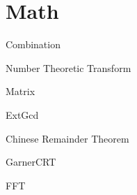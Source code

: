 \section{Math}

Combination


Number Theoretic Transform


Matrix


ExtGcd


Chinese Remainder Theorem


GarnerCRT


FFT

